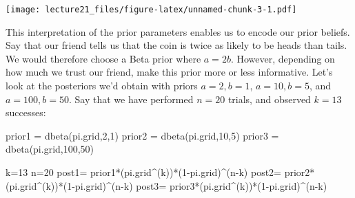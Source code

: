 \documentclass[
]{article}
\newenvironment{Shaded}{\begin{snugshade}}{\end{snugshade}}
\newcommand{\DecValTok}[1]{\textcolor[rgb]{0.00,0.00,0.81}{#1}}
\newcommand{\FunctionTok}[1]{\textcolor[rgb]{0.00,0.00,0.00}{#1}}
\newcommand{\NormalTok}[1]{#1}
\newcommand{\OtherTok}[1]{\textcolor[rgb]{0.56,0.35,0.01}{#1}}
\newcommand{\SpecialCharTok}[1]{\textcolor[rgb]{0.00,0.00,0.00}{#1}}
\begin{document}
\texttt{[image: lecture21\_files/figure-latex/unnamed-chunk-3-1.pdf]}

This interpretation of the prior parameters enables us to encode our
prior beliefs. Say that our friend tells us that the coin is twice as
likely to be heads than tails. We would therefore choose a Beta prior
where \(a=2b\). However, depending on how much we trust our friend, make
this prior more or less informative. Let's look at the posteriors we'd
obtain with priors \(a=2,b=1\), \(a=10,b=5\), and \(a=100,b=50\). Say
that we have performed \(n=20\) trials, and observed \(k=13\) successes:

\begin{Shaded}
\begin{Highlighting}[]
\NormalTok{prior1 }\OtherTok{=} \FunctionTok{dbeta}\NormalTok{(pi.grid,}\DecValTok{2}\NormalTok{,}\DecValTok{1}\NormalTok{)}
\NormalTok{prior2 }\OtherTok{=} \FunctionTok{dbeta}\NormalTok{(pi.grid,}\DecValTok{10}\NormalTok{,}\DecValTok{5}\NormalTok{)}
\NormalTok{prior3 }\OtherTok{=} \FunctionTok{dbeta}\NormalTok{(pi.grid,}\DecValTok{100}\NormalTok{,}\DecValTok{50}\NormalTok{)}

\NormalTok{k}\OtherTok{=}\DecValTok{13}
\NormalTok{n}\OtherTok{=}\DecValTok{20}
\NormalTok{post1}\OtherTok{=}\NormalTok{ prior1}\SpecialCharTok{*}\NormalTok{(pi.grid}\SpecialCharTok{\^{}}\NormalTok{(k))}\SpecialCharTok{*}\NormalTok{(}\DecValTok{1}\SpecialCharTok{{-}}\NormalTok{pi.grid)}\SpecialCharTok{\^{}}\NormalTok{(n}\SpecialCharTok{{-}}\NormalTok{k)}
\NormalTok{post2}\OtherTok{=}\NormalTok{ prior2}\SpecialCharTok{*}\NormalTok{(pi.grid}\SpecialCharTok{\^{}}\NormalTok{(k))}\SpecialCharTok{*}\NormalTok{(}\DecValTok{1}\SpecialCharTok{{-}}\NormalTok{pi.grid)}\SpecialCharTok{\^{}}\NormalTok{(n}\SpecialCharTok{{-}}\NormalTok{k)}
\NormalTok{post3}\OtherTok{=}\NormalTok{ prior3}\SpecialCharTok{*}\NormalTok{(pi.grid}\SpecialCharTok{\^{}}\NormalTok{(k))}\SpecialCharTok{*}\NormalTok{(}\DecValTok{1}\SpecialCharTok{{-}}\NormalTok{pi.grid)}\SpecialCharTok{\^{}}\NormalTok{(n}\SpecialCharTok{{-}}\NormalTok{k)}


\end{Highlighting}
\end{Shaded}
\end{document}
